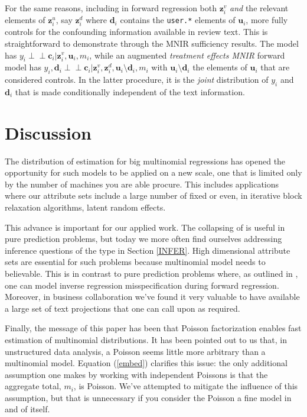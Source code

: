 \documentclass[12pt]{article}
\newcommand{\bm}[1]{\mathbf{#1}}
\newcommand{\indep}{\perp\!\!\!\perp}
\newcommand{\cd}[1]{{\tt#1}}
\begin{document}
For the same reasons, including in forward regression both $\bm{z}_i^v$ {\it
and} the relevant elements of $\bm{z}_i^u$, say $\bm{z}_i^d$ where $\bm{d}_i$
contains the \cd{user.*} elements of $\bm{u}_i$, more fully controls for the
confounding information available in review text. This is straightforward to
demonstrate through the MNIR sufficiency results.  The model  has $y_i \indep
\bm{c}_i | \bm{z}^v_i, \bm{u}_i, m_i$, while an augmented {\it treatment
effects MNIR} forward model has $y_i, \bm{d}_i \indep
\bm{c}_i | \bm{z}^v_i,\bm{z}^d_i, \bm{u}_i\!\setminus\!\bm{d}_i, m_i$ with
$\bm{u}_i\!\setminus\!\bm{d}_i$ the  elements of $\bm{u}_i$ that are
considered controls. In the latter procedure, it is  the {\it joint}
distribution of $y_i$ and $\bm{d}_i$ that is made conditionally independent of
the text information.

\section{Discussion}
\label{END}

The distribution of estimation for big multinomial regressions has opened the
opportunity for such models to be applied on a new  scale, one that is limited
only by the number of machines you are able procure.  This includes
applications where our attribute sets include a large number of fixed or even,
in iterative block relaxation algorithms, latent random effects.

This advance is important for our applied work.  The collapsing of
\cite{taddy_multinomial_2013} is useful in pure prediction problems, but today
we more often find ourselves addressing inference questions  of the type in
Section \ref{INFER}.  High dimensional attribute sets are essential for such
problems because multinomial model needs to believable. This is in contrast to
pure prediction problems where, as outlined in \cite{taddy_rejoinder:_2013},
one can model inverse regression misspecification during forward regression.  Moreover, in
business collaboration we've found it very
valuable to have available a large set of text projections that one can call
upon as required.

Finally, the message of this paper has been that Poisson factorization  enables fast estimation of multinomial distributions.  It has been pointed
out to us that, in unstructured data analysis, a Poisson seems little more
arbitrary than a multinomial model.  Equation (\ref{embed}) clarifies
this issue:  the only additional assumption one makes by working with
independent Poissons is that the aggregate total, $m_i$, is Poisson.  We've
attempted to mitigate the influence of this assumption, but that is
unnecessary if you consider the Poisson a fine model in and of itself.
\end{document}
